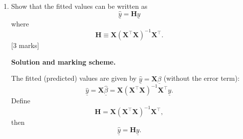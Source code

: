 \documentclass{article}
\begin{document}
\begin{enumerate}[label=(\alph*)]
\begin{mdframed}[linecolor=black, linewidth=1pt]
    Differentiate w.r.t.\ $\underline{\beta}$ and set to zero:
    \[
    \nabla_{\underline{\beta}}S(\underline{\beta})
    = -2\bm{X}^{\top}\underline{y} + 2\bm{X}^{\top}\bm{X}\underline{\beta}
    = 0.
    \]
    
    So we obtain the normal equations
    \[
    \bm{X}^{\top}\bm{X}\,\underline{\beta} = \bm{X}^{\top}\underline{y}.
    \]
    
    Assuming $\bm{X}^{\top}\bm{X}$ is invertible (which holds here since there are two parameters and the mothers' weights are not all identical), we solve:
    \[
    \hat{\underline{\beta}} = (\bm{X}^{\top}\bm{X})^{-1}\bm{X}^{\top}\underline{y}.
    \]
    
    \textbf{Marks (5):}
    \begin{itemize}
      \item 1 mark: defines residuals $\underline{\varepsilon} = \underline{y}-\bm{X}\underline{\beta}$.
      \item 2 marks: expands $S(\underline{\beta}) = (\underline{y}-\bm{X}\underline{\beta})^{\top}(\underline{y}-\bm{X}\underline{\beta})$ and differentiates to obtain $\bm{X}^{\top}\bm{X}\underline{\beta}=\bm{X}^{\top}\underline{y}$.
      \item 1 mark: states invertibility condition for $\bm{X}^{\top}\bm{X}$ (or implicitly assumes full rank).
      \item 1 mark: solves to get $\hat{\underline{\beta}} = (\bm{X}^{\top}\bm{X})^{-1}\bm{X}^{\top}\underline{y}$.
    \end{itemize}
    \end{mdframed}

    \item Show that the fitted values can be written as
    \[
    \hat{\underline{y}} = \bm{H} \underline{y}
    \]
    where
    \[
    \bm{H} \equiv \bm{X} (\bm{X}^{\top} \bm{X})^{-1} \bm{X}^{\top}.
    \]
    [3 marks]

    \begin{mdframed}[linecolor=black, linewidth=1pt]
    \textbf{Solution and marking scheme.}

    The fitted (predicted) values are given by $\underline{\hat{y}} = \bm{X} \underline{\hat{\beta}}$ (without the error term):
    \[
    \hat{\underline{y}} = \bm{X}\hat{\underline{\beta}}
                        = \bm{X}(\bm{X}^{\top}\bm{X})^{-1}\bm{X}^{\top}\underline{y}.
    \]
    Define
    \[
    \bm{H} = \bm{X}(\bm{X}^{\top}\bm{X})^{-1}\bm{X}^{\top},
    \]
    then
    \[
    \hat{\underline{y}} = \bm{H}\underline{y}.
    \]
    

\end{mdframed}
\end{enumerate}
\end{document}
